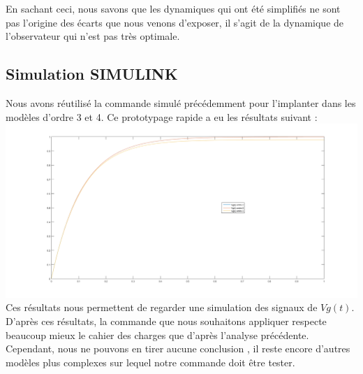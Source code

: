 En sachant ceci, nous savons que les dynamiques qui ont été simplifiés ne sont pas l'origine des écarts que nous venons d'exposer, il s'agit de la dynamique de l'observateur qui n'est pas très optimale. 

\subsection{Simulation SIMULINK}
Nous avons réutilisé la commande simulé précédemment pour l'implanter dans les modèles d'ordre 3 et 4. Ce prototypage rapide a eu les résultats suivant :
\includegraphics[scale=.3]{./III/figure/res_SIMULINK.png}
Ces résultats nous permettent de regarder une simulation des signaux de $Vg(t)$. D'après ces résultats, la commande que nous souhaitons appliquer respecte beaucoup mieux le cahier des charges que d'après l'analyse précédente. Cependant, nous ne pouvons en tirer aucune conclusion , il reste encore d'autres modèles plus complexes sur lequel notre commande doit être tester.


